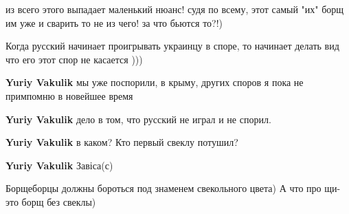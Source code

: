 \begin{itemize}
из всего этого выпадает маленький нюанс! судя по всему, этот самый "их" борщ им уже и сварить то не из чего! за что бьются то?!)

 
Когда русский начинает проигрывать украинцу в споре, то начинает делать вид что его этот спор не касается )))

\begin{itemize}
 
\textbf{Yuriy Vakulik} мы уже поспорили, в крыму, других споров я пока не примпомню в новейшее время

 
\textbf{Yuriy Vakulik} дело в том, что русский не играл и не спорил.

 
\textbf{Yuriy Vakulik} в каком? Кто первый свеклу потушил?

 
\textbf{Yuriy Vakulik} Завіса(с)
\end{itemize}

 

Борщеборцы должны бороться под знаменем свекольного цвета) А что про щи-это
борщ без свеклы)


\end{itemize}
